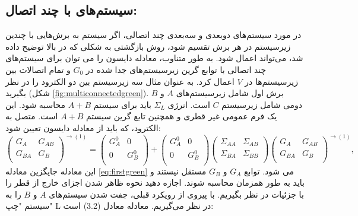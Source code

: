 \subsection{سیستم‌های با چند اتصال:}
در مورد سیستم‌های دوبعدی و سه‌بعدی چند اتصالی، اگر سیستم به برش‌هایی با چندین زیرسیستم در هر برش تقسیم شود، روش بازگشتی به شکلی که در بالا توضیح داده شد، می‌تواند اعمال شود. به طور متناوب، معادله دایسون را می توان برای سیستم‌های چند اتصالی با توابع گرین زیرسیستم‌های جدا شده در $G_0$ و تمام اتصالات بین زیرسیستم‌ها در $V$ اعمال کرد.
به عنوان مثال سه زیرسیستم بین دو الکترود را در نظر بگیرید (شکل \ref{fig:multiconnectedgreen}). برش اول شامل زیرسیستم‌های $A$ و $B$ دومی شامل زیرسیستم $C$ است. انرژی $\Sigma_{L}$ باید برای سیستم $A + B$ محاسبه شود. این یک فرم عمومی غیر قطری و همچنین تابع گرین سیستم $A + B$ است. متصل به الکترود، که باید از معادله دایسون تعیین شود:
\begin{equation}
    {{\left( \begin{matrix}
           {{G}_{A}} & {{G}_{AB}}  \\
           {{G}_{BA}} & {{G}_{B}}  \\
        \end{matrix} \right)}^{\to (1)}}=\left( \begin{matrix}
           G_{A}^{0} & 0  \\
           0 & G_{B}^{0}  \\
        \end{matrix} \right)+\left( \begin{matrix}
           G_{A}^{0} & 0  \\
           0 & G_{B}^{0}  \\
        \end{matrix} \right)\left( \begin{matrix}
           {{\Sigma }_{AA}} & {{\Sigma }_{AB}}  \\
           {{\Sigma }_{BA}} & {{\Sigma }_{BB}}  \\
        \end{matrix} \right){{\left( \begin{matrix}
           {{G}_{A}} & {{G}_{AB}}  \\
           {{G}_{BA}} & {{G}_{B}}  \\
        \end{matrix} \right)}^{\to (1)}},
        \label{eq:twodimgreenmatrix}
\end{equation}
این معادله جایگزین معادله \ref{eq:firstgreen} می شود. توابع $G_A$ و $G_B$ مستقل نیستند و باید به طور همزمان محاسبه شوند.
اجازه دهید نحوه ظاهر شدن اجزای خارج از قطر را با جزئیات در نظر بگیریم. با پیروی از رویکرد قبلی، جفت شدن سیستم‌های $A$ و $B$ را به سیستم "چپ" L در نظر می‌گیریم. معادله معادل (3.2) است:
